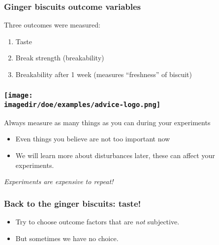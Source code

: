 \begin{frame}\frametitle{Ginger biscuits outcome variables}
	Three outcomes were measured:
	\begin{enumerate}
		\item	Taste		
		\item	Break strength (breakability)
		\item	Breakability after 1 week (measures ``freshness'' of biscuit)
	\end{enumerate}
\end{frame}

\begin{frame}\frametitle{\texttt{[image: \\imagedir/doe/examples/advice-logo.png]}}
	\begin{exampleblock}{Always measure as many things as you can during your experiments}
		\begin{itemize}
			\item	Even things you believe are not too important now
			\item	We will learn more about disturbances later, these can affect your experiments.
		\end{itemize}
	\end{exampleblock}
	\vspace{24pt}\pause
	{\color{myOrange} 	\emph{Experiments are expensive to repeat!}}
\end{frame}

\begin{frame}\frametitle{Back to the ginger biscuits: taste!}
	\begin{itemize}
		\item	Try to choose outcome factors that are \emph{not} subjective.
		\item	But sometimes we have no choice.
	\end{itemize}
\end{frame}

